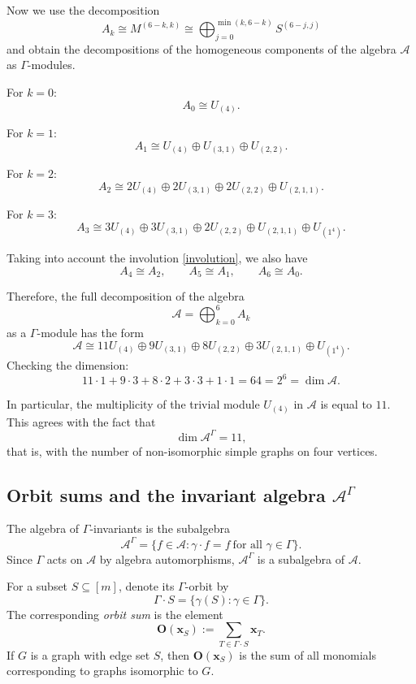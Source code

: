 \documentclass[12pt,reqno]{amsart}
\begin{document}
Now we use the decomposition
$$
A_k\cong M^{(6-k,k)}
\cong
\bigoplus_{j=0}^{\min(k,6-k)}S^{(6-j,j)}
$$
and obtain the decompositions of the homogeneous components of the algebra
$\mathcal A$ as $\Gamma$-modules.

For $k=0$:
$$
A_0\cong U_{(4)}.
$$

For $k=1$:
$$
A_1\cong
U_{(4)}\oplus U_{(3,1)}\oplus U_{(2,2)}.
$$

For $k=2$:
$$
A_2\cong
2U_{(4)}
\oplus
2U_{(3,1)}
\oplus
2U_{(2,2)}
\oplus
U_{(2,1,1)}.
$$

For $k=3$:
$$
A_3\cong
3U_{(4)}
\oplus
3U_{(3,1)}
\oplus
2U_{(2,2)}
\oplus
U_{(2,1,1)}
\oplus
U_{(1^4)}.
$$

Taking into account the involution \eqref{involution}, we also have
$$
A_4\cong A_2,\qquad A_5\cong A_1,\qquad A_6\cong A_0.
$$

Therefore, the full decomposition of the algebra
$$
\mathcal A=\bigoplus_{k=0}^{6}A_k
$$
as a $\Gamma$-module has the form
$$
\mathcal A
\cong
11U_{(4)}
\oplus
9U_{(3,1)}
\oplus
8U_{(2,2)}
\oplus
3U_{(2,1,1)}
\oplus
U_{(1^4)}.
$$
Checking the dimension:
$$
11\cdot1+9\cdot3+8\cdot2+3\cdot3+1\cdot1
=
64
=
2^6
=
\dim\mathcal A.
$$

In particular, the multiplicity of the trivial module $U_{(4)}$ in
$\mathcal A$ is equal to $11$. This agrees with the fact that
$$
\dim \mathcal A^\Gamma=11,
$$
that is, with the number of non-isomorphic simple graphs on four vertices.



\subsection{Orbit sums and the invariant algebra 
$\mathcal A^\Gamma$}

The algebra of $\Gamma$-invariants is the subalgebra
$$
\mathcal A^\Gamma
=
\{f\in\mathcal A:\gamma\cdot f=f\ \text{for all }\gamma\in\Gamma\}.
$$
Since $\Gamma$ acts on $\mathcal A$ by algebra automorphisms,
$\mathcal A^\Gamma$ is a subalgebra of $\mathcal A$.

For a subset $S\subseteq[m]$, denote its $\Gamma$-orbit by
$$
\Gamma\cdot S=\{\gamma(S):\gamma\in\Gamma\}.
$$
The corresponding \emph{orbit sum} is the element
\begin{equation}
\mathbf O(\boldsymbol{x}_S):=\sum_{T\in\Gamma\cdot S}\boldsymbol{x}_T.
\end{equation}
If $G$ is a graph with edge set $S$, then $\mathbf O(\boldsymbol{x}_S)$ is
the sum of all monomials corresponding to graphs isomorphic to $G$.
\end{document}
